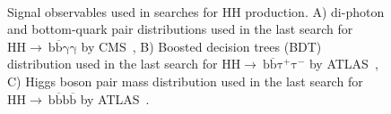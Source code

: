 \begin{figure}[ht!]
\centering
\captionsetup[subfigure]{justification=centering}
\\
\caption[Signal observables used in searches for HH production]{Signal observables used in searches for HH production. A) di-photon and bottom-quark pair distributions used in the last search for $\mathrm{HH\rightarrow~b\overline{b}\gamma\gamma}$ by CMS~\cite{cmsfullrun2bbgg}, B) Boosted decision trees (BDT) distribution used in the last search for $\mathrm{HH\rightarrow~b\overline{b}\tau^{+}\tau^{-}}$ by ATLAS~\cite{bbttatlas1}, C) Higgs boson pair mass distribution used in the last search for $\mathrm{HH\rightarrow~b\overline{b}b\overline{b}}$ by ATLAS~\cite{bbbbatlas}.}
\label{fig:hhsearchobservables}
\end{figure}

